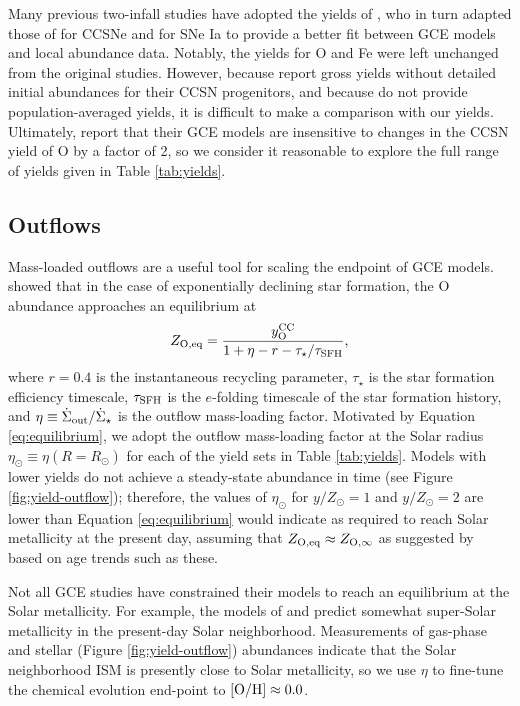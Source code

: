 \documentclass[twocolumn,twocolappendix,linenumbers]{aastex631}
\newcommand{\mathOH}{{\rm [O/H]}}
\newcommand{\yZ}[1]{$y/Z_\odot=#1$}
\begin{document}
Many previous two-infall studies have adopted the yields of \citet{francois_evolution_2004}, who in turn adapted those of \citet{woosley_evolution_1995} for CCSNe and \citet{iwamoto_nucleosynthesis_1999} for SNe Ia to provide a better fit between GCE models and local abundance data. Notably, the yields for O and Fe were left unchanged from the original studies. However, because \citet{woosley_evolution_1995} report gross yields without detailed initial abundances for their CCSN progenitors, and because \citet{francois_evolution_2004} do not provide population-averaged yields, it is difficult to make a comparison with our yields. Ultimately, \citet{francois_evolution_2004} report that their GCE models are insensitive to changes in the CCSN yield of O by a factor of 2, so we consider it reasonable to explore the full range of yields given in Table \ref{tab:yields}.

\subsection{Outflows}
\label{sec:outflows}

Mass-loaded outflows are a useful tool for scaling the endpoint of GCE models. \citet{weinberg_equilibrium_2017} showed that in the case of exponentially declining star formation, the O abundance approaches an equilibrium at
\begin{equation}
    \label{eq:equilibrium}
    Z_{\rm O,eq} = \frac{y_{\rm O}^{\rm CC}}{1 + \eta - r - \tau_\star/\tau_{\rm SFH}},
\end{equation}
where $r=0.4$ is the instantaneous recycling parameter, $\tau_\star$ is the star formation efficiency timescale, $\tau_{\rm SFH}$ is the $e$-folding timescale of the star formation history, and $\eta\equiv \dot\Sigma_{\rm out}/\dot\Sigma_\star$ is the outflow mass-loading factor. Motivated by Equation \ref{eq:equilibrium}, we adopt the outflow mass-loading factor at the Solar radius $\eta_\odot\equiv\eta(R=R_\odot)$ for each of the yield sets in Table \ref{tab:yields}. Models with lower yields do not achieve a steady-state abundance in time (see Figure \ref{fig:yield-outflow}); therefore, the values of $\eta_\odot$ for \yZ{1} and \yZ{2} are lower than Equation \ref{eq:equilibrium} would indicate as required to reach Solar metallicity at the present day, assuming that $Z_{\rm O,eq}\approx Z_{\rm O,\infty}$ as suggested by \citet{johnson_milky_2024} based on age trends such as these.

Not all GCE studies have constrained their models to reach an equilibrium at the Solar metallicity. For example, the models of \citet{palla_chemical_2020} and \citet{spitoni_remind_2024} predict somewhat super-Solar metallicity in the present-day Solar neighborhood. Measurements of gas-phase \citep[e.g.,][]{mendez-delgado_gradients_2022} and stellar (Figure \ref{fig:yield-outflow}) abundances  indicate that the Solar neighborhood ISM is presently close to Solar metallicity, so we use $\eta$ to fine-tune the chemical evolution end-point to $\mathOH\approx0.0$.
\end{document}
